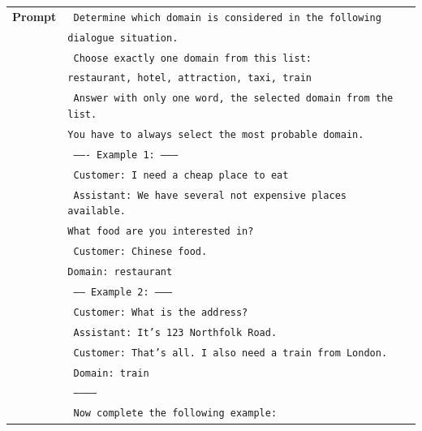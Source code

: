 \begin{table}[tp]
    \centering\small
    \begin{tabular}{rl}
      \toprule
      \textbf{Prompt} & \texttt{{\color{cyan!80!yellow!80!black!100 } Determine which domain is considered in the following}}\\
      & \texttt{{\color{cyan!80!yellow!80!black!100 }dialogue situation. }}\\
      & \texttt{ {\color{green!100!yellow!70!black!100 } Choose exactly one domain from this list:}}\\
      & \texttt{ {\color{green!100!yellow!70!black!100 }restaurant, hotel, attraction, taxi, train }} \\
      & \texttt{ {\color{cyan!80!yellow!80!black!100 } Answer with only one word, the selected domain from the list. }}\\
      & \texttt{ {\color{cyan!80!yellow!80!black!100 }You have to always select the most probable domain.}} \\
& \texttt{{\color{red!50!yellow!90!black!100!}  ------- Example 1: -------- }} \\
& \texttt{{\color{red!50!yellow!90!black!100!} Customer: I need a cheap place to eat}} \\
&\texttt{ {\color{red!50!yellow!90!black!100!} Assistant: We have several not expensive places available. }} \\
& \texttt{ {\color{red!50!yellow!90!black!100!}What food are you interested in?}} \\
& \texttt{{\color{red!50!yellow!90!black!100!} Customer: Chinese food.}} \\
& \texttt{{\color{red!50!yellow!90!black!100!}Domain: restaurant}} \\
& \texttt{{\color{red!50!yellow!90!black!100!} ------ Example 2: -------- } }\\
& \texttt{{\color{red!50!yellow!90!black!100!} Customer: What is the address?} } \\
&\texttt{{\color{red!50!yellow!90!black!100!} Assistant: It's 123 Northfolk Road. }} \\
& \texttt{ {\color{red!50!yellow!90!black!100!} Customer: That's all. I also need a train from London. }} \\
&  \texttt{{\color{red!50!yellow!90!black!100!} Domain: train }}\\
& \texttt{{\color{red!50!yellow!90!black!100!} ----------- }} \\
& \texttt{{\color{cyan!80!yellow!80!black!100 } Now complete the following example:}} \\

\end{tabular}
\end{table}
